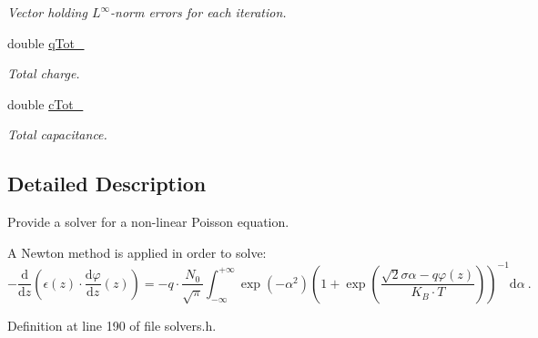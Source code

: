 \begin{DoxyCompactItemize}
\begin{DoxyCompactList}\small\item\em Vector holding $ L^\infty $-\/norm errors for each iteration. \end{DoxyCompactList}\item 
\hypertarget{classNonLinearPoisson1D_ae1963262f050f62954c9966d12b4f1b5}{double \hyperlink{classNonLinearPoisson1D_ae1963262f050f62954c9966d12b4f1b5}{q\-Tot\-\_\-}}\label{classNonLinearPoisson1D_ae1963262f050f62954c9966d12b4f1b5}

\begin{DoxyCompactList}\small\item\em Total charge. \end{DoxyCompactList}\item 
\hypertarget{classNonLinearPoisson1D_a15f65780cee04f1053be486efbdc3270}{double \hyperlink{classNonLinearPoisson1D_a15f65780cee04f1053be486efbdc3270}{c\-Tot\-\_\-}}\label{classNonLinearPoisson1D_a15f65780cee04f1053be486efbdc3270}

\begin{DoxyCompactList}\small\item\em Total capacitance. \end{DoxyCompactList}\end{DoxyCompactItemize}


\subsection{Detailed Description}
Provide a solver for a non-\/linear Poisson equation. 

A Newton method is applied in order to solve\-: \[ -\frac{\mathrm{d}}{\mathrm{d}z} \left(\epsilon(z) \cdot \frac{\mathrm{d}\varphi}{\mathrm{d}z}(z) \right) = - q \cdot \frac{N_0}{\sqrt{\pi}} \int_{-\infty}^{+\infty} \exp\left(-\alpha^2\right) \left( 1 + \exp\left( \frac{\sqrt{2}\sigma\alpha - q\varphi(z)}{K_B \cdot T} \right) \right)^{-1} \mathrm{d}\alpha ~ . \] 

Definition at line 190 of file solvers.\-h.



